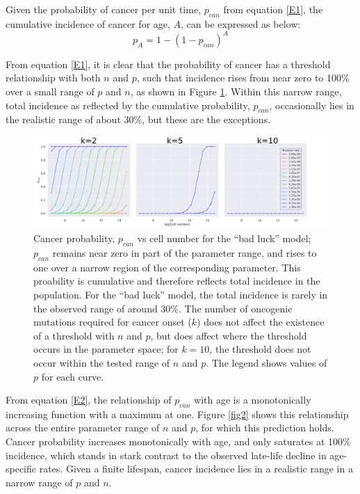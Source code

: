 \documentclass[10pt,twocolumn,twoside]{article}
\begin{document}
Given the probability of cancer per unit time, $p_{can}$ from equation \ref{E1}, the cumulative incidence of cancer for age, $A$, can be expressed as below:
\begin{equation}
	\label{E2}
	p_{A} = 1-(1-p_{can})^{A}
\end{equation}

From equation \ref{E1}, it is clear that the probability of cancer has a threshold relationship with both $n$ and $p$, such that incidence rises from near zero to 100\% over a small range of $p$ and $n$, as shown in Figure \ref{fig1}. Within this narrow range, total incidence as reflected by the cumulative probability, $p_{can}$, occasionally lies in the realistic range of about 30\%, but these are the exceptions.

\begin{figure}[tbhp]
	\centering
	\includegraphics[width=\linewidth]{fig1.png}
	\caption{Cancer probability, $p_{can}$ vs cell number for the ``bad luck'' model; $p_{can}$ remains near zero in part of the parameter range, and rises to one over a narrow region of the corresponding parameter. This proability is cumulative and therefore reflects total incidence in the population. For the ``bad luck'' model, the total incidence is rarely in the observed range of around 30\%. The number of oncogenic mutations required for cancer onset ($k$) does not affect the existence of a threshold with $n$ and $p$, but does affect where the threshold occurs in the parameter space; for $k=10$, the threshold does not occur within the tested range of $n$ and $p$. The legend shows values of $p$ for each curve.}
	\label{fig1}
\end{figure}

From equation \ref{E2}, the relationship of $p_{can}$ with age is a monotonically increasing function with a maximum at one. Figure \ref{fig2} shows this relationship across the entire parameter range of $n$ and $p$, for which this prediction holds. Cancer probability increases monotonically with age, and only saturates at 100\% incidence, which stands in stark contrast to the observed late-life decline in age-specific rates. Given a finite lifespan, cancer incidence lies in a realistic range in a narrow range of $p$ and $n$.
\end{document}
